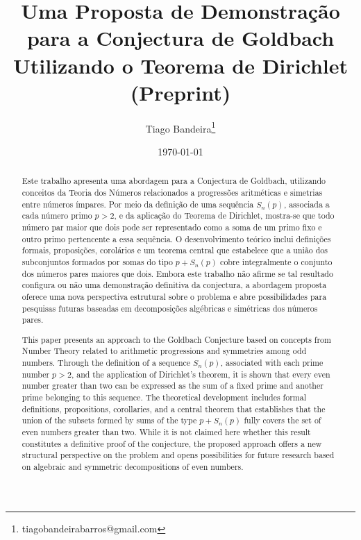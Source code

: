 \documentclass[a4paper,11pt]{article}
\title{\textbf{Uma Proposta de Demonstração para a Conjectura de Goldbach Utilizando o Teorema de Dirichlet}\\
	\large (Preprint)}
\author{
	Tiago Bandeira\thanks{tiagobandeirabarros@gmail.com} 
}
\date{\today}
\theoremstyle{definition}
\theoremstyle{remark}
\begin{document}
	
	\maketitle
	\begin{otherlanguage}{brazil}
	\begin{abstract}
		Este trabalho apresenta uma abordagem para a Conjectura de Goldbach, utilizando conceitos da Teoria dos Números relacionados a progressões aritméticas e simetrias entre números ímpares. Por meio da definição de uma sequência \(S_n(p)\), associada a cada número primo \(p > 2\), e da aplicação do Teorema de Dirichlet, mostra-se que todo número par maior que dois pode ser representado como a soma de um primo fixo e outro primo pertencente a essa sequência. O desenvolvimento teórico inclui definições formais, proposições, corolários e um teorema central que estabelece que a união dos subconjuntos formados por somas do tipo \(p + S_n(p)\) cobre integralmente o conjunto dos números pares maiores que dois. Embora este trabalho não afirme se tal resultado configura ou não uma demonstração definitiva da conjectura, a abordagem proposta oferece uma nova perspectiva estrutural sobre o problema e abre possibilidades para pesquisas futuras baseadas em decomposições algébricas e simétricas dos números pares.
	\end{abstract}
	\end{otherlanguage}
	

	\begin{abstract}
		This paper presents an approach to the Goldbach Conjecture based on concepts from Number Theory related to arithmetic progressions and symmetries among odd numbers. Through the definition of a sequence \(S_n(p)\), associated with each prime number \(p > 2\), and the application of Dirichlet's theorem, it is shown that every even number greater than two can be expressed as the sum of a fixed prime and another prime belonging to this sequence. The theoretical development includes formal definitions, propositions, corollaries, and a central theorem that establishes that the union of the subsets formed by sums of the type \(p + S_n(p)\) fully covers the set of even numbers greater than two. While it is not claimed here whether this result constitutes a definitive proof of the conjecture, the proposed approach offers a new structural perspective on the problem and opens possibilities for future research based on algebraic and symmetric decompositions of even numbers.	
	\end{abstract}
	
\end{document}
